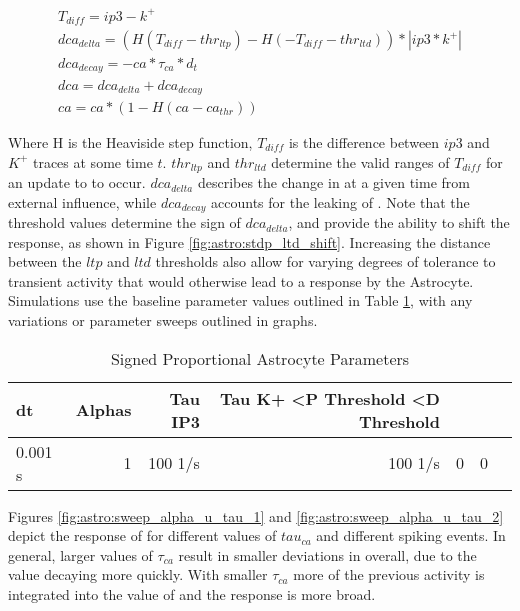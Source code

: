\begin{align}
  T_{diff} = ip3 - k^+ \\
  dca_{delta} = (H(T_{diff} - thr_{ltp}) - H(-T_{diff} - thr_{ltd})) * |ip3*k^+| \\
  dca_{decay} = -ca * \tau_{ca} * d_t \\
  dca = dca_{delta} + dca_{decay} \label{eq:astro:rate-u} \\
  ca = ca * (1 - H(ca - ca_{thr})) \label{eq:astro:u-reset}
\end{align}

Where H is the Heaviside step function, $T_{diff}$ is the difference between
$ip3$ and $K^+$ traces at some time $t$. $thr_{ltp}$ and $thr_{ltd}$ determine
the valid ranges of $T_{diff}$ for an update to \ca to occur. $dca_{delta}$
describes the change in \ca at a given time from external influence, while
$dca_{decay}$ accounts for the leaking of \ca. Note that the threshold values
determine the sign of $dca_{delta}$, and provide the ability to shift the \ca
response, as shown in Figure \ref{fig:astro:stdp_ltd_shift}. Increasing the distance
between the $ltp$ and $ltd$ thresholds also allow for varying degrees of
tolerance to transient activity that would otherwise lead to a response by the
Astrocyte. Simulations use the baseline parameter values outlined in Table
\ref{table:ordered_prop_params}, with any variations or parameter sweeps
outlined in graphs.

\begin{table}[!htp]\centering
  \caption{Signed Proportional Astrocyte Parameters} \label{table:ordered_prop_params}
  \scriptsize
  \begin{tabular}{lrrrrrr}\toprule
    dt &Alphas &Tau IP3 &Tau K+ <P Threshold <D Threshold \\\midrule
    0.001 s &1 &100 1/s &100 1/s &0 &0 \\
    \bottomrule
  \end{tabular}
\end{table}



Figures \ref{fig:astro:sweep_alpha_u_tau_1} and
\ref{fig:astro:sweep_alpha_u_tau_2} depict the response of \ca for
different values of $tau_{ca}$ and different spiking events. In general,
larger values of $\tau_{ca}$ result in smaller deviations in \ca overall, due
to the value decaying more quickly. With smaller $\tau_{ca}$ more of the
previous activity is integrated into the value of \ca and the response is
more broad.

